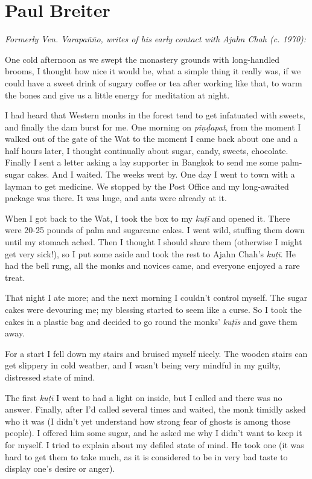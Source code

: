 
\section{Paul Breiter}

\emph{Formerly Ven. Varapañño, writes of his early contact with Ajahn Chah (c. 1970):}

One cold afternoon as we swept the monastery grounds with long-handled
brooms, I thought how nice it would be, what a simple thing it really
was, if we could have a sweet drink of sugary coffee or tea after
working like that, to warm the bones and give us a little energy for
meditation at night. 

I had heard that Western monks in the forest tend to get infatuated with
sweets, and finally the dam burst for me. One morning on
\emph{piṇḍapat}, from the moment I walked out of the gate of the Wat to
the moment I came back about one and a half hours later, I thought
continually about sugar, candy, sweets, chocolate. Finally I sent a
letter asking a lay supporter in Bangkok to send me some palm-sugar
cakes. And I waited. The weeks went by. One day I went to town with a
layman to get medicine. We stopped by the Post Office and my
long-awaited package was there. It was huge, and ants were already at
it. 

When I got back to the Wat, I took the box to my \emph{kuṭī} and opened
it. There were 20-25 pounds of palm and sugarcane cakes. I went wild,
stuffing them down until my stomach ached. Then I thought I should share
them (otherwise I might get very sick!), so I put some aside and took
the rest to Ajahn Chah's \emph{kuṭī}. He had the bell rung, all the
monks and novices came, and everyone enjoyed a rare treat. 

That night I ate more; and the next morning I couldn't control myself. 
The sugar cakes were devouring me; my blessing started to seem like a
curse. So I took the cakes in a plastic bag and decided to go round the
monks' \emph{kuṭīs} and gave them away. 

For a start I fell down my stairs and bruised myself nicely. The wooden
stairs can get slippery in cold weather, and I wasn't being very mindful
in my guilty, distressed state of mind. 

The first \emph{kuṭī} I went to had a light on inside, but I called and
there was no answer. Finally, after I'd called several times and waited, 
the monk timidly asked who it was (I didn't yet understand how strong
fear of ghosts is among those people). I offered him some sugar, and he
asked me why I didn't want to keep it for myself. I tried to explain
about my defiled state of mind. He took one (it was hard to get them to
take much, as it is considered to be in very bad taste to display one's
desire or anger). 

